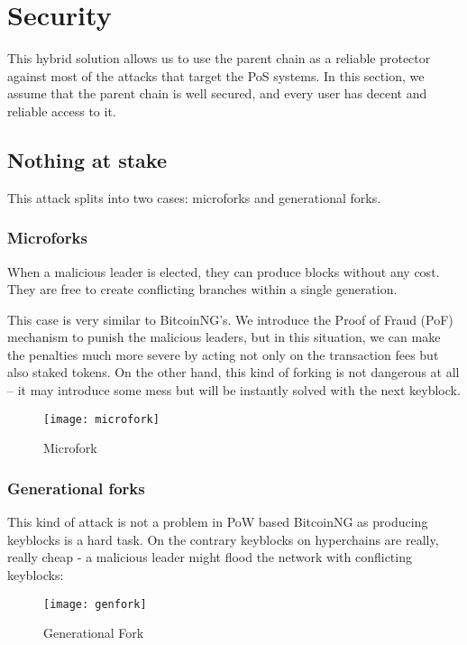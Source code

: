 \section{Security}

This hybrid solution allows us to use the parent chain as a
reliable protector against most of the attacks that target the PoS systems.
\cite{pos_attacks}
In this section, we assume that the parent chain is well secured, and every
user has decent and reliable access to it.

\subsection{Nothing at stake}

This attack splits into two cases: microforks and generational forks.

\subsubsection{Microforks}

When a malicious leader is elected, they can produce blocks without any cost.
They are free to create conflicting branches within a single generation.

This case is very similar to BitcoinNG's\cite{bcng}. We introduce the Proof of Fraud (PoF)
mechanism to punish the malicious leaders, but in this situation, we can make
the penalties much more severe by acting not only on the transaction fees
but also staked tokens. On the other hand, this kind of forking is not dangerous
at all – it may introduce some mess but will be instantly solved with the next keyblock.

\begin{figure}[h]
	\caption{Microfork}
	\centering
	\texttt{[image: microfork]}
\end{figure}

\subsubsection{Generational forks}

This kind of attack is not a problem in PoW based BitcoinNG as producing
keyblocks is a hard task. On the contrary keyblocks on hyperchains are really,
really cheap - a malicious leader might flood the network with conflicting
keyblocks:

\begin{figure}[h]
	\caption{Generational Fork}
	\centering
	\texttt{[image: genfork]}
\end{figure}

